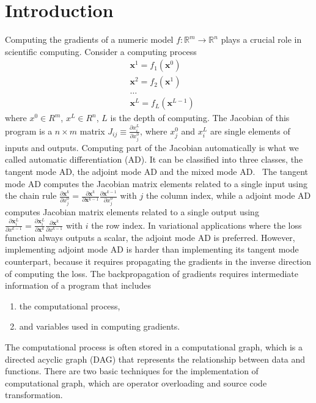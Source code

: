 \documentclass{article}
\newcommand{\<}{\langle}
\renewcommand{\>}{\rangle}
\newcommand{\vx}{{\mathbf{x}}}
\theoremstyle{definition}\newtheorem{definition}{\textit{Definition}}
\begin{document}
\section{Introduction}\label{sec:intro}
    Computing the gradients of a numeric model $f : \mathbb{R}^m \rightarrow \mathbb{R}^n$ plays a crucial role in scientific computing. Consider a computing process
\begin{align*}
    &\vx^1 = f_1(\vx^0)\\
    &\vx^2 = f_2(\vx^1)\\
    &\ldots\\
    &\vx^L = f_L(\vx^{L-1})
\end{align*}
where $x^0\in R^m$, $x^L\in R^n$, $L$ is the depth of computing.
The Jacobian of this program is a $n\times m$ matrix $J_{ij} \equiv \frac{\partial x^L_i}{\partial x_j^0}$, where $x_j^0$ and $x_i^L$ are single elements of inputs and outputs.
Computing part of the Jacobian automatically is what we called automatic differentiation (AD). It can be classified into three classes, the tangent mode AD, the adjoint mode AD and the mixed mode AD.~\cite{Hascoet2013}
    The tangent mode AD computes the Jacobian matrix elements related to a single input using the chain rule $\frac{\partial \vx^k}{\partial x^0_j} = \frac{\partial \vx^k}{\partial \vx^{k-1}}\frac{\partial \vx^{k-1}}{\partial x^0_j}$ with $j$ the column index, while a adjoint mode AD computes Jacobian matrix elements related to a single output using $\frac{\partial \vx^L_i}{\partial x^{k-1}} = \frac{\partial \vx^L_i}{\partial \vx^{k}}\frac{\partial \vx^{k}}{\partial x^{k-1}}$ with $i$ the row index.
    In variational applications where the loss function always outputs a scalar, the adjoint mode AD is preferred.
However, implementing adjoint mode AD is harder than implementing its tangent mode counterpart, because it requires propagating the gradients in the inverse direction of computing the loss. The backpropagation of gradients requires intermediate information of a program that includes
\begin{enumerate}
    \item the computational process,
    \item and variables used in computing gradients.
\end{enumerate}
    The computational process is often stored in a computational graph, which is a directed acyclic graph (DAG) that represents the relationship between data and functions.
    There are two basic techniques for the implementation of computational graph, which are operator overloading and source code transformation.
\end{document}
